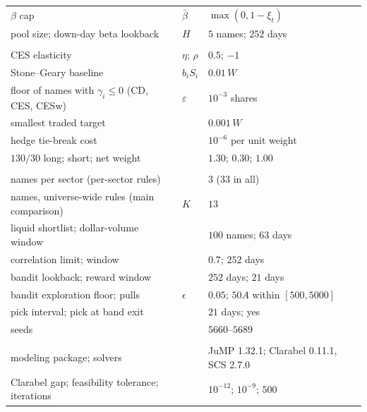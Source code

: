 \begin{table}[H]
\begin{tabular}{@{}lll@{}}
$\beta$ cap & $\bar\beta$ & $\max(0, 1 - \xi_t)$ \\
pool size; down-day beta lookback & $H$ & $5$ names; $252$ days \\
\addlinespace
\multicolumn{3}{@{}l}{\emph{Weighting}} \\
CES elasticity & $\eta$; $\rho$ & $0.5$; $-1$ \\
Stone--Geary baseline & $b_i S_i$ & $0.01\,W$ \\
floor of names with $\gamma_i \le 0$ (CD, CES, CESw) & $\varepsilon$ & $10^{-3}$ shares \\
smallest traded target & & $0.001\,W$ \\
hedge tie-break cost & & $10^{-6}$ per unit weight \\
$130/30$ long; short; net weight & & $1.30$; $0.30$; $1.00$ \\
\addlinespace
\multicolumn{3}{@{}l}{\emph{Selection}} \\
names per sector (per-sector rules) & & $3$ ($33$ in all) \\
names, universe-wide rules (main comparison) & $K$ & $13$ \\
liquid shortlist; dollar-volume window & & $100$ names; $63$ days \\
correlation limit; window & & $0.7$; $252$ days \\
bandit lookback; reward window & & $252$ days; $21$ days \\
bandit exploration floor; pulls & $\epsilon$ & $0.05$; $50A$ within $[500, 5000]$ \\
pick interval; pick at band exit & & $21$ days; yes \\
seeds & & $5660$--$5689$ \\
\addlinespace
\multicolumn{3}{@{}l}{\emph{Solvers}} \\
modeling package; solvers & & JuMP 1.32.1; Clarabel 0.11.1, SCS 2.7.0 \\
Clarabel gap; feasibility tolerance; iterations & & $10^{-12}$; $10^{-9}$; $500$ \\
\bottomrule
\end{tabular}
\end{table}
